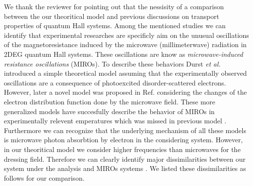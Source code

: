 \documentclass{article}
\begin{document}
We thank the reviewer for pointing out that the nessisity of a comparison between the our theoritical model and previous discussions on transport properties of quantum Hall systems.
Among the mentioned studies we can identify that experimental researches \cite{zudov01,mani02,zudov03,mani04} are specificly aim on the unusual oscillations of the magnetoresistance induced by the microwave (millimeterwave) radiation in 2DEG quantum Hall systems. These oscillations are know as \textit{microwave-induced resistance oscillations} (MIROs). To describe these behaviors Durst \textit{et al.} \cite{durst03} introduced a simple theoretical model assuming that the experimentally observed oscillations are a consequence of photoexcited disorder-scattered electrons.
However, later a novel model was proposed in Ref. \cite{dmitriev03,dmitriev05,dmitriev09} considering the changes of the electron distribution function done by the microwave field. These more generalized models \cite{dmitriev03,dmitriev05,dmitriev09} have succesfully describe the behavior of MIROs in experimentally relevent emperatures which was missed in previous model \cite{durst03}.
Furthermore we can recognize that the underlying mechanism of all these models \cite{durst03,dmitriev03,dmitriev05,dmitriev09} is microwave photon absorbtion by electron in the considering system. However, in our theoritical model we consider higher frequencies than microwaves for the dressing field. Therefore we can clearly identify major dissimilarities between our system under the analysis and MIROs systems \cite{durst03,dmitriev03,dmitriev05,dmitriev09}. We listed these dissimilarities as follows for our comparison.
\end{document}
